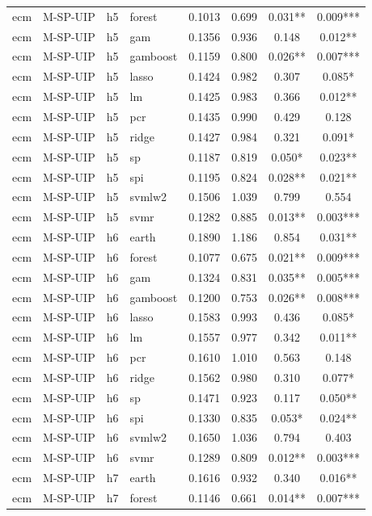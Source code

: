 \begin{ThreePartTable}
\begin{longtable}[t]{llclcccc}
ecm & M-SP-UIP & h5 & forest & 0.1013 & 0.699 & 0.031** & 0.009***\\
ecm & M-SP-UIP & h5 & gam & 0.1356 & 0.936 & 0.148 & 0.012**\\
ecm & M-SP-UIP & h5 & gamboost & 0.1159 & 0.800 & 0.026** & 0.007***\\
ecm & M-SP-UIP & h5 & lasso & 0.1424 & 0.982 & 0.307 & 0.085*\\
ecm & M-SP-UIP & h5 & lm & 0.1425 & 0.983 & 0.366 & 0.012**\\
ecm & M-SP-UIP & h5 & pcr & 0.1435 & 0.990 & 0.429 & 0.128\\
ecm & M-SP-UIP & h5 & ridge & 0.1427 & 0.984 & 0.321 & 0.091*\\
ecm & M-SP-UIP & h5 & sp & 0.1187 & 0.819 & 0.050* & 0.023**\\
ecm & M-SP-UIP & h5 & spi & 0.1195 & 0.824 & 0.028** & 0.021**\\
ecm & M-SP-UIP & h5 & svmlw2 & 0.1506 & 1.039 & 0.799 & 0.554\\
ecm & M-SP-UIP & h5 & svmr & 0.1282 & 0.885 & 0.013** & 0.003***\\
\addlinespace
ecm & M-SP-UIP & h6 & earth & 0.1890 & 1.186 & 0.854 & 0.031**\\
ecm & M-SP-UIP & h6 & forest & 0.1077 & 0.675 & 0.021** & 0.009***\\
ecm & M-SP-UIP & h6 & gam & 0.1324 & 0.831 & 0.035** & 0.005***\\
ecm & M-SP-UIP & h6 & gamboost & 0.1200 & 0.753 & 0.026** & 0.008***\\
ecm & M-SP-UIP & h6 & lasso & 0.1583 & 0.993 & 0.436 & 0.085*\\
ecm & M-SP-UIP & h6 & lm & 0.1557 & 0.977 & 0.342 & 0.011**\\
ecm & M-SP-UIP & h6 & pcr & 0.1610 & 1.010 & 0.563 & 0.148\\
ecm & M-SP-UIP & h6 & ridge & 0.1562 & 0.980 & 0.310 & 0.077*\\
ecm & M-SP-UIP & h6 & sp & 0.1471 & 0.923 & 0.117 & 0.050**\\
ecm & M-SP-UIP & h6 & spi & 0.1330 & 0.835 & 0.053* & 0.024**\\
ecm & M-SP-UIP & h6 & svmlw2 & 0.1650 & 1.036 & 0.794 & 0.403\\
ecm & M-SP-UIP & h6 & svmr & 0.1289 & 0.809 & 0.012** & 0.003***\\
\addlinespace
ecm & M-SP-UIP & h7 & earth & 0.1616 & 0.932 & 0.340 & 0.016**\\
ecm & M-SP-UIP & h7 & forest & 0.1146 & 0.661 & 0.014** & 0.007***\\

\end{longtable}
\end{ThreePartTable}
